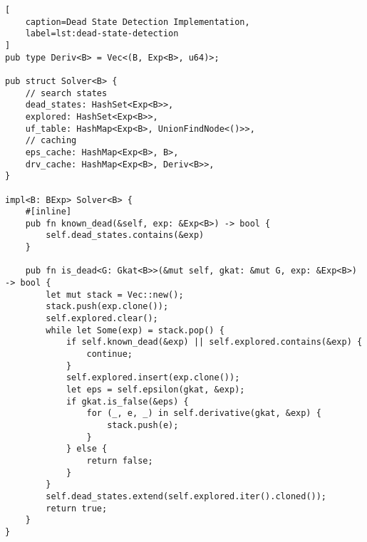 \documentclass[conference]{IEEEtran}
\begin{document}
\begin{onecolumn}
\begin{lstlisting}[
    caption=Dead State Detection Implementation,
    label=lst:dead-state-detection
]
pub type Deriv<B> = Vec<(B, Exp<B>, u64)>;

pub struct Solver<B> {
    // search states
    dead_states: HashSet<Exp<B>>,
    explored: HashSet<Exp<B>>,
    uf_table: HashMap<Exp<B>, UnionFindNode<()>>,
    // caching
    eps_cache: HashMap<Exp<B>, B>,
    drv_cache: HashMap<Exp<B>, Deriv<B>>,
}

impl<B: BExp> Solver<B> {
    #[inline]
    pub fn known_dead(&self, exp: &Exp<B>) -> bool {
        self.dead_states.contains(&exp)
    }

    pub fn is_dead<G: Gkat<B>>(&mut self, gkat: &mut G, exp: &Exp<B>) -> bool {
        let mut stack = Vec::new();
        stack.push(exp.clone());
        self.explored.clear();
        while let Some(exp) = stack.pop() {
            if self.known_dead(&exp) || self.explored.contains(&exp) {
                continue;
            }
            self.explored.insert(exp.clone());
            let eps = self.epsilon(gkat, &exp);
            if gkat.is_false(&eps) {
                for (_, e, _) in self.derivative(gkat, &exp) {
                    stack.push(e);
                }
            } else {
                return false;
            }
        }
        self.dead_states.extend(self.explored.iter().cloned());
        return true;
    }
}
\end{lstlisting}
\end{onecolumn}
\end{document}
